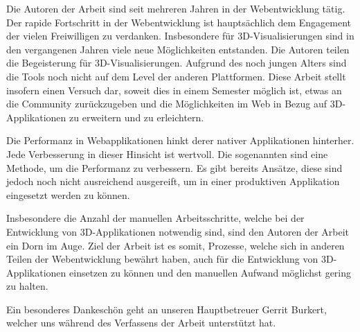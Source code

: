 Die Autoren der Arbeit sind seit mehreren Jahren in der Webentwicklung tätig. Der rapide Fortschritt in der Webentwicklung ist hauptsächlich dem Engagement der vielen Freiwilligen zu verdanken.
Insbesondere für 3D-Visualisierungen sind in den vergangenen Jahren viele neue Möglichkeiten entstanden. Die Autoren teilen die Begeisterung für 3D-Visualisierungen. Aufgrund des noch jungen Alters sind die Tools noch nicht auf dem Level der anderen Plattformen. Diese Arbeit stellt insofern einen Versuch dar, soweit dies in einem Semester möglich ist, etwas an die Community zurückzugeben und die Möglichkeiten im Web in Bezug auf 3D-Applikationen zu erweitern und zu erleichtern.

Die Performanz in Webapplikationen hinkt derer nativer Applikationen hinterher. Jede Verbesserung in dieser Hinsicht ist wertvoll. Die sogenannten  sind eine Methode, um die Performanz zu verbessern. Es gibt bereits Ansätze, diese sind jedoch noch nicht ausreichend ausgereift, um in einer produktiven Applikation eingesetzt werden zu können.

Insbesondere die Anzahl der manuellen Arbeitsschritte, welche bei der Entwicklung von 3D-Applikationen notwendig sind, sind den Autoren der Arbeit ein Dorn im Auge. Ziel der Arbeit ist es somit, Prozesse, welche sich in anderen Teilen der Webentwicklung bewährt haben, auch für die Entwicklung von 3D-Applikationen einsetzen zu können und den manuellen Aufwand möglichst gering zu halten.

Ein besonderes Dankeschön geht an unseren Hauptbetreuer Gerrit Burkert, welcher uns während des Verfassens der Arbeit unterstützt hat.